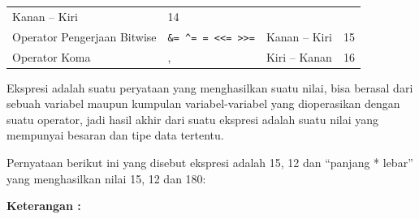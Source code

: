 \begin{longtable}[]{@{}llll@{}}
\begin{minipage}[t]{0.14\columnwidth}
Kanan -- Kiri
\strut\end{minipage} &
\begin{minipage}[t]{0.05\columnwidth}\raggedright\strut
14
\strut\end{minipage}\tabularnewline
\begin{minipage}[t]{0.52\columnwidth}\raggedright\strut
Operator Pengerjaan Bitwise
\strut\end{minipage} &
\begin{minipage}[t]{0.17\columnwidth}\raggedright\strut
\texttt{\&=\ \^{}=\ \textbar{}=\ \textless{}\textless{}=\ \textgreater{}\textgreater{}=}
\strut\end{minipage} &
\begin{minipage}[t]{0.14\columnwidth}\raggedright\strut
Kanan -- Kiri
\strut\end{minipage} &
\begin{minipage}[t]{0.05\columnwidth}\raggedright\strut
15
\strut\end{minipage}\tabularnewline
\begin{minipage}[t]{0.52\columnwidth}\raggedright\strut
Operator Koma
\strut\end{minipage} &
\begin{minipage}[t]{0.17\columnwidth}\raggedright\strut
,
\strut\end{minipage} &
\begin{minipage}[t]{0.14\columnwidth}\raggedright\strut
Kiri -- Kanan
\strut\end{minipage} &
\begin{minipage}[t]{0.05\columnwidth}\raggedright\strut
16
\strut\end{minipage}\tabularnewline
\bottomrule
\end{longtable}

Ekspresi adalah suatu peryataan yang menghasilkan suatu nilai, bisa
berasal dari sebuah variabel maupun kumpulan variabel-variabel yang
dioperasikan dengan suatu operator, jadi hasil akhir dari suatu ekspresi
adalah suatu nilai yang mempunyai besaran dan tipe data tertentu.

Pernyataan berikut ini yang disebut ekspresi adalah 15, 12 dan ``panjang
* lebar'' yang menghasilkan nilai 15, 12 dan 180:



\textbf{Keterangan :}

